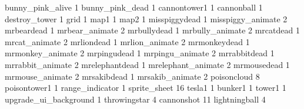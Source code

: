 bunny_pink_alive 1
bunny_pink_dead 1
cannontower1 1
cannonball 1
destroy_tower 1
grid 1
map1 1
map2 1
misspiggydead 1
misspiggy_animate 2
mrbeardead 1
mrbear_animate 2
mrbullydead 1
mrbully_animate 2
mrcatdead 1
mrcat_animate 2
mrliondead 1
mrlion_animate 2
mrmonkeydead 1
mrmonkey_animate 2
mrpingudead 1
mrpingu_animate 2
mrrabbitdead 1
mrrabbit_animate 2
mrelephantdead 1
mrelephant_animate 2
mrmousedead 1
mrmouse_animate 2
mrsakibdead 1
mrsakib_animate 2
poisoncloud 8
poisontower1 1
range_indicator 1
sprite_sheet 16
tesla1 1
bunker1 1
tower1 1
upgrade_ui_background 1
throwingstar 4
cannonshot 11
lightningball 4
